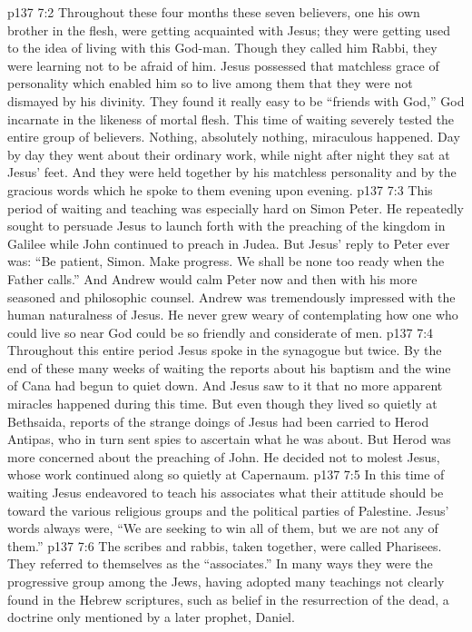 \vs p137 7:2 Throughout these four months these seven believers, one his own brother in the flesh, were getting acquainted with Jesus; they were getting used to the idea of living with this God\hyp{}man. Though they called him Rabbi, they were learning not to be afraid of him. Jesus possessed that matchless grace of personality which enabled him so to live among them that they were not dismayed by his divinity. They found it really easy to be “friends with God,” God incarnate in the likeness of mortal flesh. This time of waiting severely tested the entire group of believers. Nothing, absolutely nothing, miraculous happened. Day by day they went about their ordinary work, while night after night they sat at Jesus’ feet. And they were held together by his matchless personality and by the gracious words which he spoke to them evening upon evening.
\vs p137 7:3 This period of waiting and teaching was especially hard on Simon Peter. He repeatedly sought to persuade Jesus to launch forth with the preaching of the kingdom in Galilee while John continued to preach in Judea. But Jesus’ reply to Peter ever was: \textcolor{ubdarkred}{“Be patient, Simon. Make progress. We shall be none too ready when the Father calls.”} And Andrew would calm Peter now and then with his more seasoned and philosophic counsel. Andrew was tremendously impressed with the human naturalness of Jesus. He never grew weary of contemplating how one who could live so near God could be so friendly and considerate of men.
\vs p137 7:4 Throughout this entire period Jesus spoke in the synagogue but twice. By the end of these many weeks of waiting the reports about his baptism and the wine of Cana had begun to quiet down. And Jesus saw to it that no more apparent miracles happened during this time. But even though they lived so quietly at Bethsaida, reports of the strange doings of Jesus had been carried to Herod Antipas, who in turn sent spies to ascertain what he was about. But Herod was more concerned about the preaching of John. He decided not to molest Jesus, whose work continued along so quietly at Capernaum.
\vs p137 7:5 In this time of waiting Jesus endeavored to teach his associates what their attitude should be toward the various religious groups and the political parties of Palestine. Jesus’ words always were, \textcolor{ubdarkred}{“We are seeking to win all of them, but we are not  any of them.”}
\pc \vs p137 7:6 The scribes and rabbis, taken together, were called Pharisees. They referred to themselves as the “associates.” In many ways they were the progressive group among the Jews, having adopted many teachings not clearly found in the Hebrew scriptures, such as belief in the resurrection of the dead, a doctrine only mentioned by a later prophet, Daniel.
